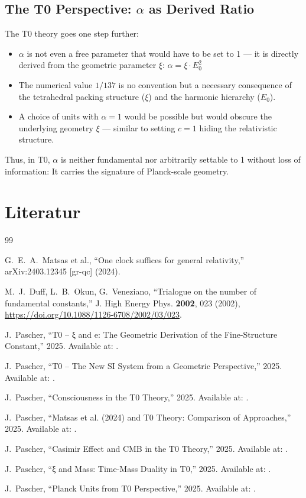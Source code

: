	\subsection{The T0 Perspective: $\alpha$ as Derived Ratio}
	The T0 theory goes one step further:
	\begin{itemize}
		\item $\alpha$ is not even a free parameter that would have to be set to 1 --- it is directly derived from the geometric parameter $\xi$:
		$\alpha = \xi \cdot E_0^2$
		\item The numerical value $1/137$ is no convention but a necessary consequence of the tetrahedral packing structure ($\xi$) and the harmonic hierarchy ($E_0$).
		\item A choice of units with $\alpha = 1$ would be possible but would obscure the underlying geometry $\xi$ --- similar to setting $c = 1$ hiding the relativistic structure.
	\end{itemize}
	
	Thus, in T0, $\alpha$ is neither fundamental nor arbitrarily settable to 1 without loss of information: It carries the signature of Planck-scale geometry.
	
\section{Literatur}

\begin{thebibliography}{99}
	
	G.~E.~A.~Matsas et al.,
	``One clock suffices for general relativity,''
	arXiv:2403.12345 [gr-qc] (2024).
	
	M.~J.~Duff, L.~B.~Okun, G.~Veneziano,
	``Trialogue on the number of fundamental constants,''
	J. High Energy Phys. \textbf{2002}, 023 (2002),
	\url{https://doi.org/10.1088/1126-6708/2002/03/023}.
	
	J.~Pascher,
	``T0 – ξ and e: The Geometric Derivation of the Fine-Structure Constant,''
	2025.
	Available at:
	.
	
	J.~Pascher,
	``T0 – The New SI System from a Geometric Perspective,''
	2025.
	Available at:
	.
	
	J.~Pascher,
	``Consciousness in the T0 Theory,''
	2025.
	Available at:
	.
	
	J.~Pascher,
	``Matsas et al. (2024) and T0 Theory: Comparison of Approaches,''
	2025.
	Available at:
	.
	
	J.~Pascher,
	``Casimir Effect and CMB in the T0 Theory,''
	2025.
	Available at:
	.
	
	J.~Pascher,
	``ξ and Mass: Time-Mass Duality in T0,''
	2025.
	Available at:
	.
	
	J.~Pascher,
	``Planck Units from T0 Perspective,''
	2025.
	Available at:
	.
	
\end{thebibliography}